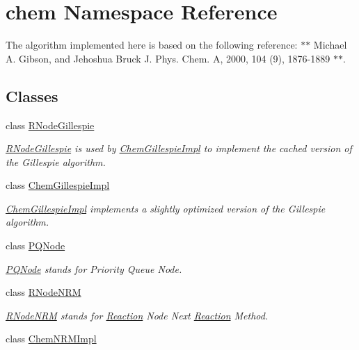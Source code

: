 \hypertarget{namespacechem}{\section{chem Namespace Reference}
\label{namespacechem}
}


The algorithm implemented here is based on the following reference\-: $\ast$$\ast$ Michael A. Gibson, and Jehoshua Bruck J. Phys. Chem. A, 2000, 104 (9), 1876-\/1889 $\ast$$\ast$.  


\subsection*{Classes}
\begin{DoxyCompactItemize}
\item 
class \hyperlink{classchem_1_1RNodeGillespie}{R\-Node\-Gillespie}
\begin{DoxyCompactList}\small\item\em \hyperlink{classchem_1_1RNodeGillespie}{R\-Node\-Gillespie} is used by \hyperlink{classchem_1_1ChemGillespieImpl}{Chem\-Gillespie\-Impl} to implement the cached version of the Gillespie algorithm. \end{DoxyCompactList}\item 
class \hyperlink{classchem_1_1ChemGillespieImpl}{Chem\-Gillespie\-Impl}
\begin{DoxyCompactList}\small\item\em \hyperlink{classchem_1_1ChemGillespieImpl}{Chem\-Gillespie\-Impl} implements a slightly optimized version of the Gillespie algorithm. \end{DoxyCompactList}\item 
class \hyperlink{classchem_1_1PQNode}{P\-Q\-Node}
\begin{DoxyCompactList}\small\item\em \hyperlink{classchem_1_1PQNode}{P\-Q\-Node} stands for Priority Queue Node. \end{DoxyCompactList}\item 
class \hyperlink{classchem_1_1RNodeNRM}{R\-Node\-N\-R\-M}
\begin{DoxyCompactList}\small\item\em \hyperlink{classchem_1_1RNodeNRM}{R\-Node\-N\-R\-M} stands for \hyperlink{classchem_1_1Reaction}{Reaction} Node Next \hyperlink{classchem_1_1Reaction}{Reaction} Method. \end{DoxyCompactList}\item 
class \hyperlink{classchem_1_1ChemNRMImpl}{Chem\-N\-R\-M\-Impl}

\end{DoxyCompactItemize}
